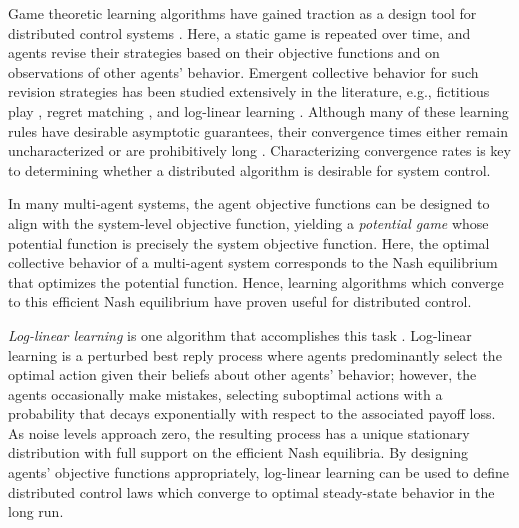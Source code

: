 
\label{ch2}

Game theoretic learning algorithms have gained traction as a design tool for distributed control systems \cite{Marden2008,Zhu2009,Goto2010,Staudigl2012,Fox2010}.  Here, a static game is repeated over time, and agents revise their strategies based on their objective functions and on observations of other agents' behavior.  Emergent collective behavior for such revision strategies has been studied extensively in the literature, e.g., fictitious play \cite{fp1,fp2,jsfp}, regret matching \cite{Hart2000}, and log-linear learning \cite{Alos-Ferrer2010, Blume1993, Shah2010}.  Although many of these learning rules have desirable asymptotic guarantees, their convergence times either remain uncharacterized or are prohibitively long \cite{Ellison2000, Kandori1993,Shah2010,Hart2010}. Characterizing convergence rates is key to determining whether a distributed algorithm is desirable for system control.

In many multi-agent systems, the agent objective functions can be designed to align with the system-level objective function, yielding  a \emph{potential game} \cite{Monderer1996} whose potential function is precisely the system objective function.  Here, the optimal collective behavior of a multi-agent system corresponds to the Nash equilibrium that optimizes the potential function. Hence, learning algorithms which converge to this efficient Nash equilibrium have proven useful for distributed control.

\emph{Log-linear learning} is one algorithm that accomplishes this task \cite{Blume1993}. Log-linear learning is a  {perturbed} best reply process where agents predominantly select the optimal action given their beliefs about other agents' behavior; however, the agents occasionally make mistakes, selecting suboptimal actions with a probability that decays exponentially with respect to the associated payoff loss.  
As noise levels approach zero, the resulting process has a unique stationary distribution with full support on the efficient Nash equilibria.  By designing agents' objective functions appropriately, log-linear learning can be used to define distributed control laws which converge to optimal steady-state behavior in the long run.%


